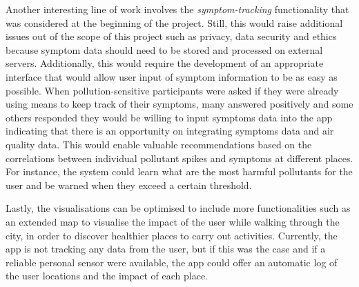 Another interesting line of work involves the \textit{symptom-tracking} functionality that was considered at the beginning of the project. Still, this would raise additional issues out of the scope of this project such as privacy, data security and ethics because symptom data should need to be stored and processed on external servers. Additionally, this would require the development of an appropriate interface that would allow user input of symptom information to be as easy as possible. When pollution-sensitive participants were asked if they were already using means to keep track of their symptoms, many answered positively and some others responded they would be willing to input symptoms data into the app indicating that there is an opportunity on integrating symptoms data and air quality data. This would enable valuable recommendations based on the correlations between individual pollutant spikes and symptoms at different places. For instance, the system could learn what are the most harmful pollutants for the user and be warned when they exceed a certain threshold. 

Lastly, the visualisations can be optimised to include more functionalities such as an extended map to visualise the impact of the user while walking through the city, in order to discover healthier places to carry out activities. Currently, the app is not tracking any data from the user, but if this was the case and if a reliable personal sensor were available, the app could offer an automatic log of the user locations and the impact of each place. 